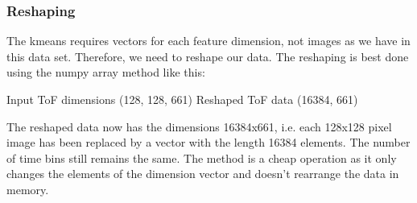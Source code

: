 \documentclass[letterpaper,10pt,english]{sphinxmanual}
\begin{document}
\subsubsection{Reshaping}
\label{\detokenize{ML4NeutronImageSegmentation:reshaping}}
The k\sphinxhyphen{}means requires vectors for each feature dimension, not images as we have in this data set. Therefore, we need to reshape our data. The reshaping is best done using the numpy array method  like this:

\begin{sphinxVerbatim}[commandchars=\\\{\}]
\PYG{p}{[}\PYG{p}{[}\PYG{p}{]}\PYG{p}{[}\PYG{p}{]}\PYG{p}{[}\PYG{p}{]}\PYG{p}{]}
\end{sphinxVerbatim}

\begin{sphinxVerbatim}[commandchars=\\\{\}]
Input ToF dimensions (128, 128, 661)
Reshaped ToF data (16384, 661)
\end{sphinxVerbatim}

The reshaped data  now has the dimensions 16384x661, i.e. each 128x128 pixel image has been replaced by a vector with the length 16384 elements. The number of time bins still remains the same. The method is a cheap operation as it only changes the elements of the dimension vector and doesn’t rearrange the data in memory.
\end{document}
